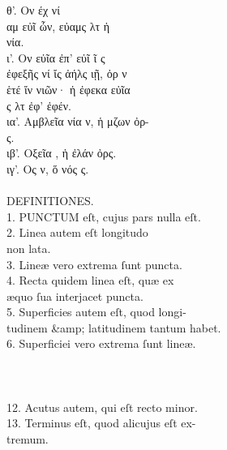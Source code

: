 \begin{typeLatin}
θ'. Ον   έχ  νί  \\
αμ εὐῖ ὦν, εὐαμς λτ ἡ  \\
νία. \\
ι'. Ον  εὐῖα ἐπ' εὐῖ ῖ ς  \\
ἐφεξῆς νί ἴς ἀήλς ιῇ, ὀρ ν  \\
ἑτέ  ἴν νιῶν·  ἡ ἐφεκα εὐῖα  \\
ς λτ ἐφ'  ἐφέν. \\
ια'. Αμβλεῖα νία ν, ἡ μζων ὀρ-  \\
ς. \\
ιβ'. Οξεῖα , ἡ ἐλάν ὀρς. \\
ιγ'. Ος ν, ὅ νός  ς. \\
\\
DEFINITIONES.\\
1. PUNCTUM eſt, cujus pars nulla eſt.\\
2. Linea autem eſt longitudo \\
non lata.\\
3. Lineæ vero extrema ſunt puncta.\\
4. Recta quidem linea eſt, quæ ex \\
æquo ſua interjacet puncta.\\
5. Superficies autem eſt, quod longi- \\
tudinem &amp; latitudinem tantum habet.\\
6. Superficiei vero extrema ſunt lineæ.\\
\\\untranscribedText \\ \\
12. Acutus autem, qui eſt recto minor.\\
13. Terminus eſt, quod alicujus eſt ex- \\
tremum.
\end{typeLatin}

